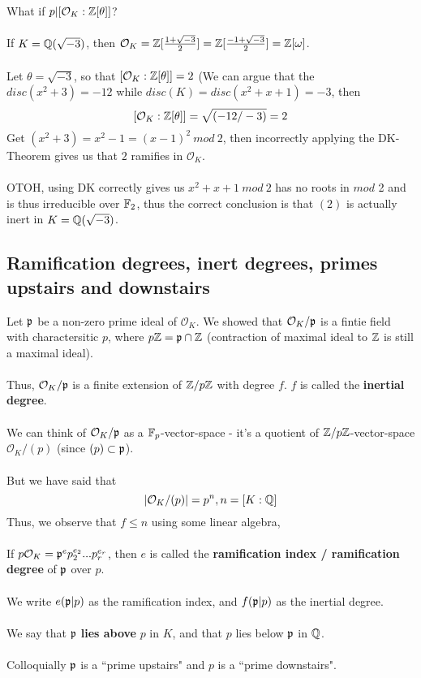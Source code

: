 \begin{remark}
What if $p | [\mathcal{O}_K : \mathbb{Z}[\theta]]$?\\\\
If $K = \mathbb{Q}(\sqrt{-3})$, then $\mathcal{O}_K = \mathbb{Z}[\frac{1 + \sqrt{-3}}{2}] = \mathbb{Z}[\frac{-1 + \sqrt{-3}}{2}] = \mathbb{Z}[\omega]$.\\\\
Let $\theta = \sqrt{-3}$, so that $[\mathcal{O}_K : \mathbb{Z}[\theta]] = 2$ (We can argue that the $disc(x^2 + 3) = -12$ while $disc(K) = disc(x^2 + x + 1) = -3$, then
\[[\mathcal{O}_K : \mathbb{Z}[\theta]] = \sqrt{(-12/-3)} = 2\]
Get $(x^2 + 3) = x^2 - 1 = (x - 1)^2\ mod\ 2$, then incorrectly applying the DK-Theorem gives us that $2$ ramifies in $\mathcal{O}_K$.\\\\
OTOH, using DK correctly gives us $x^2 + x + 1\ mod\ 2$ has no roots in $mod$ 2 and is thus irreducible over $\mathbb{F}_2$, thus the correct conclusion is that $(2)$ is actually inert in $K = \mathbb{Q}(\sqrt{-3})$.
\end{remark}

\subsection{Ramification degrees, inert degrees, primes upstairs and downstairs}

Let $\mathfrak{p}$ be a non-zero prime ideal of $\mathcal{O}_K$. We showed that $\mathcal{O}_K/\mathfrak{p}$ is a fintie field with charactersitic $p$, where $p \mathbb{Z} = \mathfrak{p} \cap \mathbb{Z}$ (contraction of maximal ideal to $\mathbb{Z}$ is still a maximal ideal).\\\\
Thus, $\mathcal{O}_K/\mathfrak{p}$ is a finite extension of $\mathbb{Z}/p\mathbb{Z}$ with degree $f$. $f$ is called the \textbf{inertial degree}.\\\\
We can think of $\mathcal{O}_K/\mathfrak{p}$ as a $\mathbb{F}_p$-vector-space - it's a quotient of $\mathbb{Z}/p\mathbb{Z}$-vector-space $\mathcal{O}_K/(p)$ (since $(p) \subset \mathfrak{p}$).\\\\
But we have said that
\[|\mathcal{O}_K/(p)| = p^n, n = [K: \mathbb{Q}]\]
Thus, we observe that $f \leq n$ using some linear algebra,\\\\
If $p \mathcal{O}_K = \mathfrak{p}^e p_2^{e_2} ... p_r^{e_r}$, then $e$ is called the \textbf{ramification index / ramification degree} of $\mathfrak{p}$ over $p$.\\\\
We write $e(\mathfrak{p} | p)$ as the ramification index, and $f(\mathfrak{p} | p)$ as the inertial degree.\\\\
We say that $\mathfrak{p}$ \textbf{lies above} $p$ in $K$, and that $p$ lies below $\mathfrak{p}$ in $\mathbb{Q}$.\\\\
Colloquially $\mathfrak{p}$ is a ``prime upstairs" and $p$ is a ``prime downstairs".

